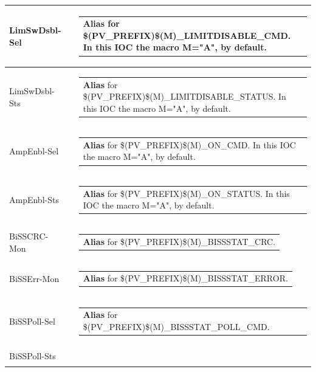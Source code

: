 \documentclass[openany]{article}
\begin{document}
\begin{longtable}{| m{4.5cm} m{2.5cm}  m{8.5cm} |}
        LimSwDsbl-Sel &  & \begin{tabular}{@{}m{6cm}@{}}
                \textbf{\color{blue} Alias} for \$(PV\_PREFIX)\$(M)\_LIMITDISABLE\_CMD. In this IOC the macro M="A", by default.
            \end{tabular} \hypertarget{}{}\\ \hline
        LimSwDsbl-Sts &  & \begin{tabular}{@{}m{6cm}@{}}
                \textbf{\color{blue} Alias} for \$(PV\_PREFIX)\$(M)\_LIMITDISABLE\_STATUS. In this IOC the macro M="A", by default.
            \end{tabular} \hypertarget{pv:amp-enbl}{}\\ \hline
        AmpEnbl-Sel &  & \begin{tabular}{@{}m{6cm}@{}}
                \textbf{\color{blue} Alias} for \$(PV\_PREFIX)\$(M)\_ON\_CMD. In this IOC the macro M="A", by default.
            \end{tabular} \hypertarget{}{}\\ \hline
        AmpEnbl-Sts &  & \begin{tabular}{@{}m{6cm}@{}}
                \textbf{\color{blue} Alias} for \$(PV\_PREFIX)\$(M)\_ON\_STATUS. In this IOC the macro M="A", by default.
            \end{tabular} \hypertarget{pv:biss-crc-mon}{}\\ \hline
        BiSSCRC-Mon &  & \begin{tabular}{@{}m{6cm}@{}}
                \textbf{\color{blue} Alias} for \$(PV\_PREFIX)\$(M)\_BISSSTAT\_CRC.
            \end{tabular} \hypertarget{pv:biss-err-mon}{}\\ \hline
        BiSSErr-Mon &  & \begin{tabular}{@{}m{6cm}@{}}
                \textbf{\color{blue} Alias} for \$(PV\_PREFIX)\$(M)\_BISSSTAT\_ERROR.
            \end{tabular} \hypertarget{pv:biss-poll}{}\\ \hline
        BiSSPoll-Sel &  & \begin{tabular}{@{}m{6cm}@{}}
                \textbf{\color{blue} Alias} for \$(PV\_PREFIX)\$(M)\_BISSSTAT\_POLL\_CMD.
            \end{tabular} \hypertarget{}{}\\ \hline
        BiSSPoll-Sts &  & \begin{tabular}{@{}m{6cm}@{}}

\end{tabular}
\end{longtable}
\end{document}
